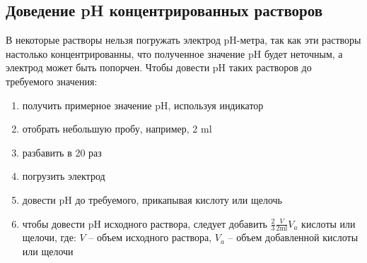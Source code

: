 \subsection{Доведение pH концентрированных растворов}
\label{set-pH}
В некоторые растворы нельзя погружать электрод pH-метра,
так как эти растворы настолько концентрированны, что полученное значение pH будет неточным,
а электрод может быть попорчен.
Чтобы довести pH таких растворов до требуемого значения:
\begin{enumerate}
\item получить примерное значение pH, используя индикатор
\item отобрать небольшую пробу, например, 2 ml
\item разбавить в 20 раз
\item погрузить электрод
\item довести pH до требуемого, прикапывая кислоту или щелочь
\item чтобы довести pH исходного раствора, следует добавить
     $ \frac{2}{3} \frac{V}{2\text{ml}} V_a$ кислоты или щелочи, где:
     $ V $ -- объем исходного раствора,
     $ V_a $ -- объем добавленной кислоты или щелочи
\end{enumerate}

